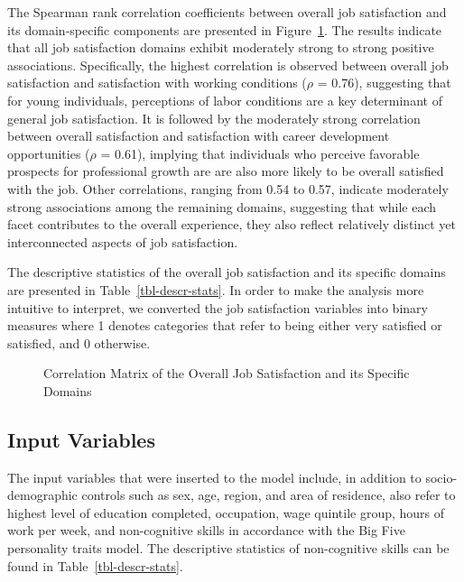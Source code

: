 \documentclass[
]{interact}
\begin{document}
The Spearman rank correlation coefficients between overall job
satisfaction and its domain-specific components are presented in
Figure~\ref{fig-corr-jobsatisf}. The results indicate that all job
satisfaction domains exhibit moderately strong to strong positive
associations. Specifically, the highest correlation is observed between
overall job satisfaction and satisfaction with working conditions
(\(\rho\) = 0.76), suggesting that for young individuals, perceptions of
labor conditions are a key determinant of general job satisfaction. It
is followed by the moderately strong correlation between overall
satisfaction and satisfaction with career development opportunities
(\(\rho\) = 0.61), implying that individuals who perceive favorable
prospects for professional growth are are also more likely to be overall
satisfied with the job. Other correlations, ranging from 0.54 to 0.57,
indicate moderately strong associations among the remaining domains,
suggesting that while each facet contributes to the overall experience,
they also reflect relatively distinct yet interconnected aspects of job
satisfaction.

The descriptive statistics of the overall job satisfaction and its
specific domains are presented in Table~\ref{tbl-descr-stats}. In order
to make the analysis more intuitive to interpret, we converted the job
satisfaction variables into binary measures where 1 denotes categories
that refer to being either very satisfied or satisfied, and 0 otherwise.

\begin{figure}


\caption{\label{fig-corr-jobsatisf}Correlation Matrix of the Overall Job
Satisfaction and its Specific Domains}

\end{figure}%

\subsection{Input Variables}\label{input-variables}

The input variables that were inserted to the model include, in addition
to socio-demographic controls such as sex, age, region, and area of
residence, also refer to highest level of education completed,
occupation, wage quintile group, hours of work per week, and
non-cognitive skills in accordance with the Big Five personality traits
model. The descriptive statistics of non-cognitive skills can be found
in Table~\ref{tbl-descr-stats}.
\end{document}
